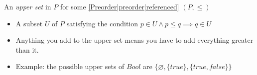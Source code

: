 

An \emph{upper set} in $P$ for some \ref{Preorder|preorder|referenced} $(P, \leq)$

\begin{itemize}
    \item A subset $U$ of $P$ satisfying the condition $p \in U \land p \leq q \implies q \in U$
    \item Anything you add to the upper set means you have to add everything greater than it.
    \item Example: the possible upper sets of $Bool$ are $\{\varnothing, \{true\}, \{true, false\}\}$
  \end{itemize}